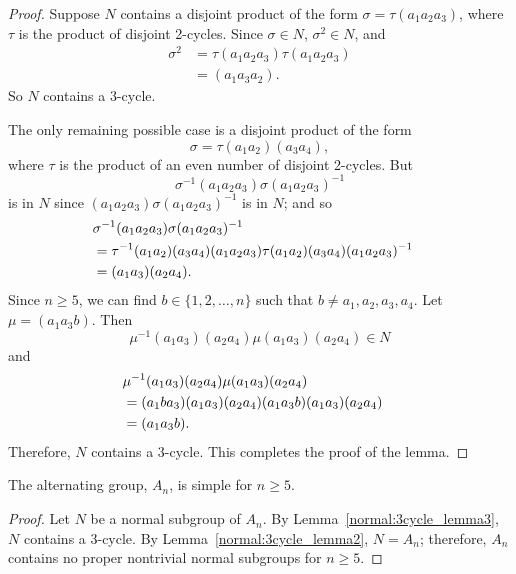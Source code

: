 \begin{proof}
 
Suppose $N$ contains a disjoint product of the form $\sigma = \tau(a_1
a_2 a_3)$, where $\tau$ is the product of disjoint 2-cycles. Since
$\sigma \in N$, $\sigma^2 \in N$, and
\begin{align*}
\sigma^2
& = \tau(a_1 a_2 a_3)\tau(a_1 a_2 a_3) \\
& =(a_1 a_3 a_2).
\end{align*}
So $N$ contains a 3-cycle.
 
 
The only remaining possible case is a disjoint product of the form
\[
\sigma = \tau (a_1 a_2) (a_3 a_4),
\]
where $\tau$ is the product of an even number of disjoint 2-cycles.
But 
\[
\sigma^{-1}(a_1 a_2 a_3)\sigma(a_1 a_2 a_3)^{-1}
\]
is in $N$ since $(a_1 a_2 a_3)\sigma(a_1 a_2 a_3)^{-1}$ is in $N$; and
so 
\begin{align*}
\lefteqn{\sigma^{-1}(a_1 a_2 a_3)\sigma(a_1 a_2 a_3)^{-1} } \\
& = \tau^{-1} (a_1 a_2) (a_3 a_4) (a_1 a_2 a_3) 
      \tau (a_1 a_2)(a_3 a_4)(a_1 a_2 a_3)^{-1} \\
& = (a_1 a_3)(a_2 a_4).
\end{align*}
Since $n \geq 5$, we can find $b \in \{1, 2, \ldots, n \}$ such that
$b \neq a_1, a_2, a_3, a_4$. Let $\mu = (a_1 a_3 b)$. Then
\[
\mu^{-1} (a_1 a_3)(a_2 a_4) \mu (a_1 a_3)(a_2 a_4) \in N
\]
and
\begin{align*}
\lefteqn{\mu^{-1} (a_1 a_3)(a_2 a_4) \mu (a_1 a_3)(a_2 a_4) } \\
& = (a_1 b a_3)(a_1 a_3)(a_2 a_4) 
      (a_1 a_3 b)(a_1 a_3)(a_2 a_4) \\
& = (a_1 a_3 b ).
\end{align*}
Therefore, $N$ contains a 3-cycle. This completes the proof of the
lemma.  
\end{proof}
 
 
\begin{theorem}\label{normal:An_simple}
The alternating group, $A_n$, is simple for $n \geq 5$. 
\end{theorem}
 
\begin{proof}
Let $N$ be a normal subgroup of $A_n$. By Lemma~\ref{normal:3cycle_lemma3}, $N$ contains a
3-cycle. By Lemma~\ref{normal:3cycle_lemma2}, $N = A_n$; therefore, $A_n$ contains no proper
nontrivial normal subgroups for $n \geq 5$.
\end{proof} 
 
 
\histhead
 
